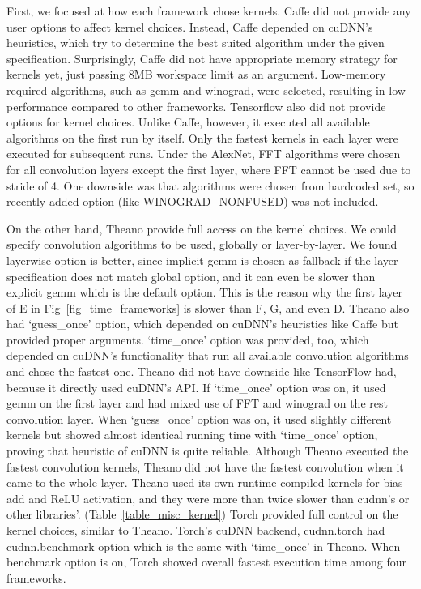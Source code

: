 First, we focused at how each framework chose kernels.
Caffe did not provide any user options to affect kernel choices.
Instead, Caffe depended on cuDNN's heuristics, which try to determine the best suited algorithm under the given specification.
Surprisingly, Caffe did not have appropriate memory strategy for kernels yet, just passing 8MB workspace limit as an argument.
Low-memory required algorithms, such as gemm and winograd, were selected, resulting in low performance compared to other frameworks.
Tensorflow also did not provide options for kernel choices.
Unlike Caffe, however, it executed all available algorithms on the first run by itself.
Only the fastest kernels in each layer were executed for subsequent runs.
Under the AlexNet, FFT algorithms were chosen for all convolution layers except the first layer, where FFT cannot be used due to stride of 4.
One downside was that algorithms were chosen from hardcoded set, so recently added option (like WINOGRAD\_NONFUSED) was not included.

On the other hand, Theano provide full access on the kernel choices.
We could specify convolution algorithms to be used, globally or layer-by-layer.
We found layerwise option is better, since implicit gemm is chosen as fallback if the layer specification does not match global option, and it can even be slower than explicit gemm which is the default option.
This is the reason why the first layer of E in Fig~\ref{fig_time_frameworks} is slower than F, G, and even D.
Theano also had `guess\_once' option, which depended on cuDNN's heuristics like Caffe but provided proper arguments.
`time\_once' option was provided, too, which depended on cuDNN's functionality that run all available convolution algorithms and chose the fastest one.
Theano did not have downside like TensorFlow had, because it directly used cuDNN's API.
If `time\_once' option was on, it used gemm on the first layer and had mixed use of FFT and winograd on the rest convolution layer.
When `guess\_once' option was on, it used slightly different kernels but showed almost identical running time with `time\_once' option, proving that heuristic of cuDNN is quite reliable.
Although Theano executed the fastest convolution kernels, Theano did not have the fastest convolution when it came to the whole layer.
Theano used its own runtime-compiled kernels for bias add and ReLU activation, and they were more than twice slower than cudnn's or other libraries'. (Table~\ref{table_misc_kernel})
Torch provided full control on the kernel choices, similar to Theano.
Torch's cuDNN backend, cudnn.torch had cudnn.benchmark option which is the same with `time\_once' in Theano.
When benchmark option is on, Torch showed overall fastest execution time among four frameworks.

